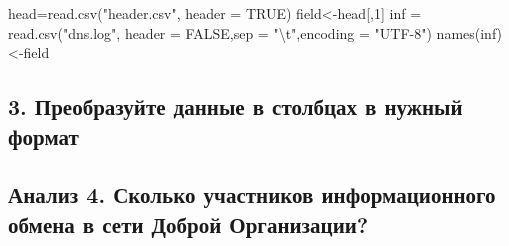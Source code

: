 \documentclass[
]{article}
\newenvironment{Shaded}{\begin{snugshade}}{\end{snugshade}}
\newcommand{\AttributeTok}[1]{\textcolor[rgb]{0.77,0.63,0.00}{#1}}
\newcommand{\ConstantTok}[1]{\textcolor[rgb]{0.00,0.00,0.00}{#1}}
\newcommand{\DecValTok}[1]{\textcolor[rgb]{0.00,0.00,0.81}{#1}}
\newcommand{\FunctionTok}[1]{\textcolor[rgb]{0.00,0.00,0.00}{#1}}
\newcommand{\NormalTok}[1]{#1}
\newcommand{\OtherTok}[1]{\textcolor[rgb]{0.56,0.35,0.01}{#1}}
\newcommand{\SpecialCharTok}[1]{\textcolor[rgb]{0.00,0.00,0.00}{#1}}
\newcommand{\StringTok}[1]{\textcolor[rgb]{0.31,0.60,0.02}{#1}}
\begin{document}
\begin{Shaded}
\begin{Highlighting}[]
\NormalTok{head}\OtherTok{=}\FunctionTok{read.csv}\NormalTok{(}\StringTok{"header.csv"}\NormalTok{, }\AttributeTok{header =} \ConstantTok{TRUE}\NormalTok{)}
\NormalTok{field}\OtherTok{\textless{}{-}}\NormalTok{head[,}\DecValTok{1}\NormalTok{]}
\NormalTok{inf }\OtherTok{=} \FunctionTok{read.csv}\NormalTok{(}\StringTok{"dns.log"}\NormalTok{, }\AttributeTok{header =} \ConstantTok{FALSE}\NormalTok{,}\AttributeTok{sep =} \StringTok{"}\SpecialCharTok{\textbackslash{}t}\StringTok{"}\NormalTok{,}\AttributeTok{encoding =} \StringTok{"UTF{-}8"}\NormalTok{)}
\FunctionTok{names}\NormalTok{(inf)}\OtherTok{\textless{}{-}}\NormalTok{field}
\end{Highlighting}
\end{Shaded}

\hypertarget{ux43fux440ux435ux43eux431ux440ux430ux437ux443ux439ux442ux435-ux434ux430ux43dux43dux44bux435-ux432-ux441ux442ux43eux43bux431ux446ux430ux445-ux432-ux43dux443ux436ux43dux44bux439-ux444ux43eux440ux43cux430ux442}{%
\subsection{3. Преобразуйте данные в столбцах в нужный
формат}\label{ux43fux440ux435ux43eux431ux440ux430ux437ux443ux439ux442ux435-ux434ux430ux43dux43dux44bux435-ux432-ux441ux442ux43eux43bux431ux446ux430ux445-ux432-ux43dux443ux436ux43dux44bux439-ux444ux43eux440ux43cux430ux442}}

\hypertarget{ux430ux43dux430ux43bux438ux437-4.-ux441ux43aux43eux43bux44cux43aux43e-ux443ux447ux430ux441ux442ux43dux438ux43aux43eux432-ux438ux43dux444ux43eux440ux43cux430ux446ux438ux43eux43dux43dux43eux433ux43e-ux43eux431ux43cux435ux43dux430-ux432-ux441ux435ux442ux438-ux434ux43eux431ux440ux43eux439-ux43eux440ux433ux430ux43dux438ux437ux430ux446ux438ux438}{%
\subsection{Анализ 4. Сколько участников информационного обмена в сети
Доброй
Организации?}\label{ux430ux43dux430ux43bux438ux437-4.-ux441ux43aux43eux43bux44cux43aux43e-ux443ux447ux430ux441ux442ux43dux438ux43aux43eux432-ux438ux43dux444ux43eux440ux43cux430ux446ux438ux43eux43dux43dux43eux433ux43e-ux43eux431ux43cux435ux43dux430-ux432-ux441ux435ux442ux438-ux434ux43eux431ux440ux43eux439-ux43eux440ux433ux430ux43dux438ux437ux430ux446ux438ux438}}
\end{document}
